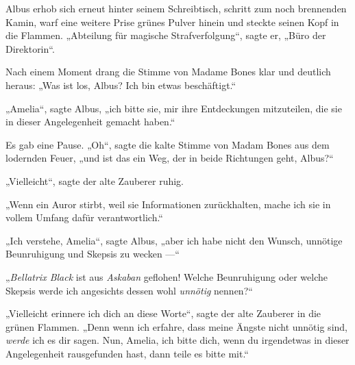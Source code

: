 Albus erhob sich erneut hinter seinem Schreibtisch, schritt zum noch brennenden Kamin, warf eine weitere Prise grünes Pulver hinein und steckte seinen Kopf in die Flammen.
„Abteilung für magische Strafverfolgung“, sagte er,
„Büro der Direktorin“.

Nach einem Moment drang die Stimme von Madame Bones klar und deutlich heraus:
„Was ist los, Albus? Ich bin etwas beschäftigt.“

„Amelia“, sagte Albus, „ich bitte sie, mir ihre Entdeckungen mitzuteilen, die sie in dieser Angelegenheit gemacht haben.“

Es gab eine Pause.
„Oh“, sagte die kalte Stimme von Madam Bones aus dem lodernden Feuer, „und ist das ein Weg, der in beide Richtungen geht, Albus?“

„Vielleicht“, sagte der alte Zauberer ruhig.

„Wenn ein Auror stirbt, weil sie Informationen zurückhalten, mache ich sie in vollem Umfang dafür verantwortlich.“

„Ich verstehe, Amelia“, sagte Albus, „aber ich habe nicht den Wunsch, unnötige Beunruhigung und Skepsis zu wecken —“

„\emph{Bellatrix Black} ist aus \emph{Askaban} geflohen! Welche Beunruhigung oder welche Skepsis werde ich angesichts dessen wohl \emph{unnötig} nennen?“

„Vielleicht erinnere ich dich an diese Worte“, sagte der alte Zauberer in die grünen Flammen.
„Denn wenn ich erfahre, dass meine Ängste nicht unnötig sind, \emph{werde} ich es dir sagen. Nun, Amelia, ich bitte dich, wenn du irgendetwas in dieser Angelegenheit rausgefunden hast, dann teile es bitte mit.“

